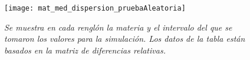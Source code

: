 \begin{figure}[H]
\centering
\texttt{[image: mat\_med\_dispersion\_pruebaAleatoria]} %
\caption[\textit{Matriz con información por materia de prueba aleatoria}]{\textit{Se muestra en cada renglón la materia y el intervalo del que se tomaron los valores para la simulación. Los datos de la tabla están basados en la matriz de diferencias relativas.}}\label{mat_med_dispersion_pruebaAl}
\end{figure}
